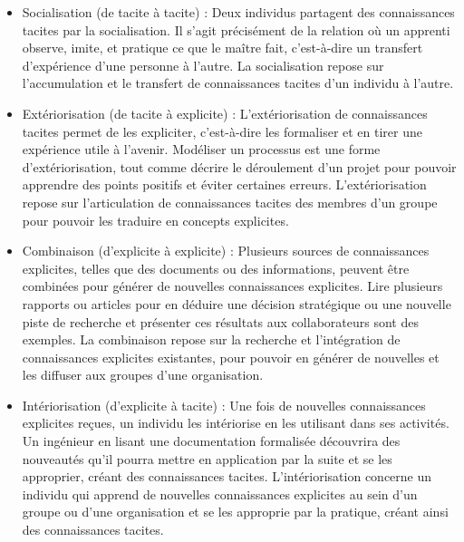 \bigskip

\begin{itemize}
\item Socialisation (de tacite à tacite) : Deux individus partagent des connaissances tacites par la socialisation.
Il s'agit précisément de la relation où un apprenti observe, imite, et pratique ce que le maître fait, c'est-à-dire un transfert d'expérience d'une personne à l'autre.
La socialisation repose sur l'accumulation et le transfert de connaissances tacites d'un individu à l'autre.\\

\item Extériorisation (de tacite à explicite) : L'extériorisation de connaissances tacites permet de les expliciter, c'est-à-dire les formaliser et en tirer une expérience utile à l'avenir.
Modéliser un processus est une forme d'extériorisation, tout comme décrire le déroulement d'un projet pour pouvoir apprendre des points positifs et éviter certaines erreurs.
L'extériorisation repose sur l'articulation de connaissances tacites des membres d'un groupe pour pouvoir les traduire en concepts explicites.\\

\item Combinaison (d'explicite à explicite) : Plusieurs sources de connaissances explicites, telles que des documents ou des informations, peuvent être combinées pour générer de nouvelles connaissances explicites.
Lire plusieurs rapports ou articles pour en déduire une décision stratégique ou une nouvelle piste de recherche et présenter ces résultats aux collaborateurs sont des exemples.
La combinaison repose sur la recherche et l'intégration de connaissances explicites existantes, pour pouvoir en générer de nouvelles et les diffuser aux groupes d'une organisation.\\

\item Intériorisation (d'explicite à tacite) : Une fois de nouvelles connaissances explicites reçues, un individu les intériorise en les utilisant dans ses activités.
Un ingénieur en lisant une documentation formalisée découvrira des nouveautés qu'il pourra mettre en application par la suite et se les approprier, créant des connaissances tacites.
L'intériorisation concerne un individu qui apprend de nouvelles connaissances explicites au sein d'un groupe ou d'une organisation et se les approprie par la pratique, créant ainsi des connaissances tacites.
\end{itemize}


